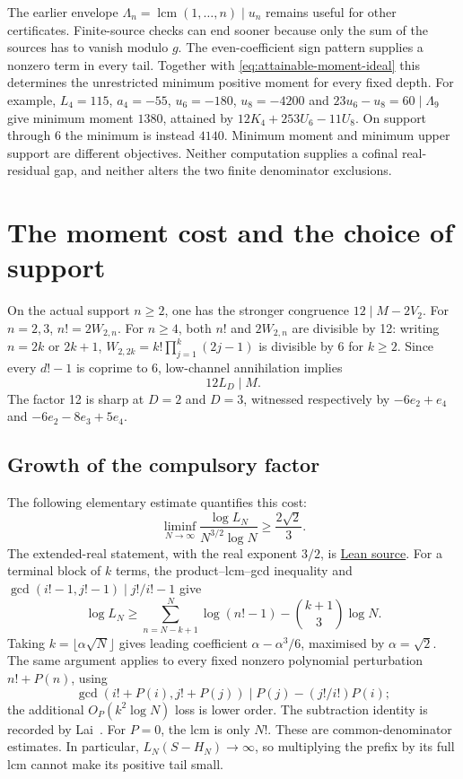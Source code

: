 \documentclass[11pt]{article}
\begin{document}
The earlier envelope $\Lambda_n=\operatorname{lcm}(1,\ldots,n)\mid u_n$
\label{eq:channel-lcm-envelope}
remains useful for other certificates.  Finite-source checks can end sooner
because only the sum of the sources has to vanish modulo $g$.
The even-coefficient sign pattern supplies a nonzero term in every tail.
Together with \eqref{eq:attainable-moment-ideal} this determines the
unrestricted minimum positive moment for every fixed depth.  For example,
$L_4=115$, $a_4=-55$, $u_6=-180$, $u_8=-4200$ and
$23u_6-u_8=60\mid\Lambda_9$ give minimum moment $1380$, attained by
$12K_4+253U_6-11U_8$.  On support through $6$ the minimum is instead $4140$.
Minimum moment and minimum upper support are different objectives.
Neither computation supplies a cofinal real-residual gap, and neither
alters the two finite denominator exclusions.

\section{The moment cost and the choice of support}\label{sec:translator}

On the actual support $n\ge2$, one has the stronger congruence
$12\mid M-2V_2$.  For $n=2,3$, $n!=2W_{2,n}$.  For $n\ge4$, both
$n!$ and $2W_{2,n}$ are divisible by 12: writing $n=2k$ or $2k+1$,
$W_{2,2k}=k!\prod_{j=1}^k(2j-1)$ is divisible by 6 for $k\ge2$.
Since every $d!-1$ is coprime to 6, low-channel annihilation implies
\begin{equation}
12L_D\mid M.\label{eq:twelve-lcm}
\end{equation}
The factor 12 is sharp at $D=2$ and $D=3$, witnessed respectively by
$-6e_2+e_4$ and $-6e_2-8e_3+5e_4$.

\subsection{Growth of the compulsory factor}
The following elementary estimate quantifies this cost:
\begin{equation}
\liminf_{N\to\infty}\frac{\log L_N}{N^{3/2}\log N}
\ge\frac{2\sqrt2}{3}.\label{res:lcm-growth}
\end{equation}
The extended-real statement, with the real exponent $3/2$, is
\href{https://github.com/wcook04/plectis-erdos/blob/f36a98bf3d3e6f65f1074e3b800e3293d5b8a51a/ErdosProblems/Erdos68/PaperCompleteLiminf.lean#L42}{Lean source}.
For a terminal block of $k$ terms, the product--lcm--gcd inequality and
$\gcd(i!-1,j!-1)\mid j!/i!-1$ give
\[
\log L_N\ge\sum_{n=N-k+1}^N\log(n!-1)
-\binom{k+1}{3}\log N.
\]
Taking $k=\lfloor\alpha\sqrt N\rfloor$ gives leading coefficient
$\alpha-\alpha^3/6$, maximised by $\alpha=\sqrt2$.  The same argument applies
to every fixed nonzero polynomial perturbation $n!+P(n)$, using
\[
\gcd(i!+P(i),j!+P(j))\mid P(j)-(j!/i!)P(i);
\]
the additional $O_P(k^2\log N)$ loss is lower order.  The subtraction identity
is recorded by Lai~\cite[(2.5)]{lai}.  For $P=0$, the lcm is only $N!$.
These are common-denominator estimates.  In particular,
$L_N(S-H_N)\to\infty$, so multiplying the prefix by its full lcm cannot
make its positive tail small.
\end{document}
